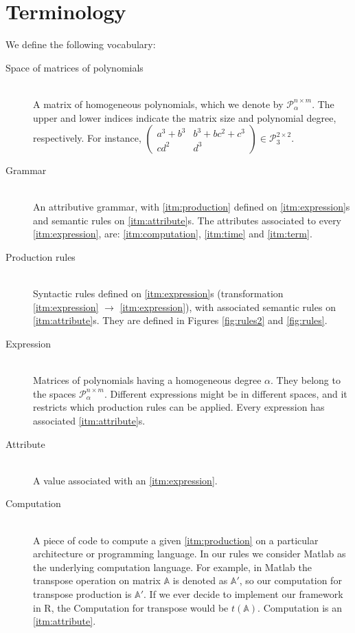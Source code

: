 \section{Terminology}
We define the following vocabulary: 

\begin{description}
  \item[Space of matrices of polynomials\label{itm:spacematrices}] \hfill \\ A matrix of homogeneous polynomials, which we denote by $\mathcal{P}^{n \times m}_{\alpha}$. The upper and lower indices indicate the matrix size and polynomial degree, respectively. For instance, $\begin{pmatrix} a^3 + b^3 & b^3 + bc^2 + c^3\\ cd^2 & d^3 \end{pmatrix} \in \mathcal{P}^{2 \times 2}_3$. 

\item[Grammar\label{itm:grammar}] \hfill \\ An attributive grammar, with \ref{itm:production} defined on \ref{itm:expression}s and semantic rules on \ref{itm:attribute}s. The attributes associated to every \ref{itm:expression}, are: \ref{itm:computation}, \ref{itm:time} and \ref{itm:term}.

\item[Production rules\label{itm:production}] \hfill \\ Syntactic rules defined on \ref{itm:expression}s (transformation \ref{itm:expression} $\rightarrow$ \ref{itm:expression}), with associated semantic rules on \ref{itm:attribute}s. They are defined in Figures \ref{fig:rules2} and \ref{fig:rules}.

\item[Expression\label{itm:expression}] \hfill \\ Matrices of polynomials having a homogeneous degree $\alpha$. They belong to the spaces $\mathcal{P}^{n \times m}_\alpha$. Different expressions might be in different spaces, and it restricts which production rules can be applied. Every expression has associated \ref{itm:attribute}s.

\item[Attribute\label{itm:attribute}] \hfill \\
  A value associated with an \ref{itm:expression}. 

\item[Computation\label{itm:computation}] \hfill \\ A piece of code to compute a given \ref{itm:production} on a particular architecture or programming language. In our rules we consider Matlab as
the underlying computation language. For example, in Matlab the transpose
  operation on matrix $\mathbb{A}$ is denoted as $\mathbb{A}'$, so our computation
  for transpose production is $\mathbb{A}'$. If we ever decide to implement our framework in R,
  the Computation for transpose would be $t(\mathbb{A})$. Computation is an \ref{itm:attribute}.


\end{description}
